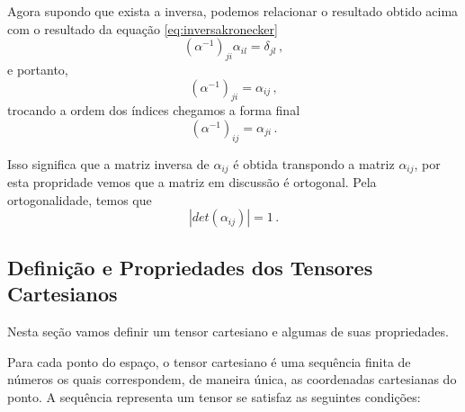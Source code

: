 Agora supondo que exista a inversa, podemos relacionar o resultado obtido acima
com o resultado da equa\c{c}\~ao \ref{eq:inversakronecker}
\begin{equation}
(\alpha^{-1})_{ji}\alpha_{il}=\delta_{jl}\, ,
\end{equation}
e portanto,
\begin{equation}
(\alpha^{-1})_{ji}=\alpha_{ij}\, ,
\end{equation}
trocando a ordem dos \'indices chegamos a forma final
\begin{equation}
(\alpha^{-1})_{ij}=\alpha_{ji}\, .
\end{equation}

Isso significa que a matriz inversa de $\alpha_{ij}$ \'e obtida
transpondo a matriz $\alpha_{ij}$, por esta propridade vemos que a
matriz em discuss\~ao \'e ortogonal. Pela ortogonalidade, temos
que
\begin{equation}
|det(\alpha_{ij})|=1\, .
\end{equation}

\subsection{Defini\c{c}\~ao e Propriedades dos Tensores Cartesianos}

Nesta se\c{c}\~ao vamos definir um tensor cartesiano e algumas de
suas propriedades.

Para cada ponto do espa\c{c}o, o tensor cartesiano \'e uma
sequ\^encia
finita de n\'umeros os quais correspondem, de maneira \'unica, as coordenadas
cartesianas do ponto. A sequ\^encia representa um tensor se
satisfaz as seguintes  condi\c{c}\~oes:

